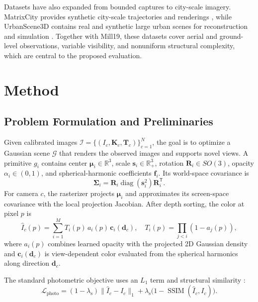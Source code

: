 \documentclass[conference]{IEEEtran}
\begin{document}
Datasets have also expanded from bounded captures to city-scale imagery. MatrixCity provides synthetic city-scale trajectories and renderings \cite{li2023matrixcity}, while UrbanScene3D contains real and synthetic large urban scenes for reconstruction and simulation \cite{lin2022urbanscene3d}. Together with Mill19, these datasets cover aerial and ground-level observations, variable visibility, and nonuniform structural complexity, which are central to the proposed evaluation.

\section{Method}

\subsection{Problem Formulation and Preliminaries}

Given calibrated images $\mathcal{I}=\{(I_c,\mathbf{K}_c,\mathbf{T}_c)\}_{c=1}^{N}$, the goal is to optimize a Gaussian scene $\mathcal{G}$ that renders the observed images and supports novel views. A primitive $g_i$ contains center $\boldsymbol{\mu}_i\in\mathbb{R}^{3}$, scale $\mathbf{s}_i\in\mathbb{R}_{+}^{3}$, rotation $\mathbf{R}_i\in SO(3)$, opacity $\alpha_i\in(0,1)$, and spherical-harmonic coefficients $\mathbf{f}_i$. Its world-space covariance is
\begin{equation}
\boldsymbol{\Sigma}_i=\mathbf{R}_i\operatorname{diag}(\mathbf{s}_i^2)\mathbf{R}_i^{\mathsf T}.
\label{eq:covariance}
\end{equation}
For camera $c$, the rasterizer projects $\boldsymbol{\mu}_i$ and approximates its screen-space covariance with the local projection Jacobian. After depth sorting, the color at pixel $p$ is
\begin{equation}
\hat{I}_c(p)=\sum_{i=1}^{M}T_i(p)\,a_i(p)\,\mathbf{c}_i(\mathbf{d}_c),\quad
T_i(p)=\prod_{j<i}\left(1-a_j(p)\right),
\label{eq:blend}
\end{equation}
where $a_i(p)$ combines learned opacity with the projected 2D Gaussian density and $\mathbf{c}_i(\mathbf{d}_c)$ is view-dependent color evaluated from the spherical harmonics along direction $\mathbf{d}_c$.

The standard photometric objective uses an $L_1$ term and structural similarity \cite{wang2004ssim}:
\begin{equation}
\mathcal{L}_{\mathrm{photo}}=(1-\lambda_{\mathrm{s}})\|\hat{I}_c-I_c\|_1
+\lambda_{\mathrm{s}}\bigl(1-\operatorname{SSIM}(\hat{I}_c,I_c)\bigr).
\label{eq:photo}
\end{equation}
\end{document}
